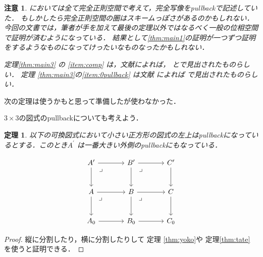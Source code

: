 \documentclass[leqno, a4paper, 12pt, dvipdfmx]{jsarticle}
\newtheorem{thm}{定理}
\newtheorem*{rmk}{注意}
\begin{document}
\begin{rmk}
\cite{com}においては全て完全正則空間で考えて，完全写像をpullbackで記述していた．
もしかしたら完全正則空間の圏はスキームっぽさがあるのかもしれない．今回の文書では，筆者が手を加えて最後の定理以外ではなるべく一般の位相空間で証明が済むようになっている．
結果として\ref{thm:main1}の証明が一つずつ証明をするようなものになってけったいなものなったかもしれない．

定理\ref{thm:main3}
の
\ref{item:comp}
は，文献\cite{mic}によれば，
\cite[Theorem 1]{nag}と\cite[Theorem, p.21]{van}で見出されたものらしい．
定理
\ref{thm:main3}の\ref{item:0pullback}
は文献\cite{the}
によれば
\cite[Lemma 1.5]{duk}
で見出されたものらしい．

\end{rmk}

次の定理は使うかもと思って準備したが使わなかった．

$3\times 3$の図式のpullbackについても考えよう．
\begin{thm}\label{thm:3by3}
以下の可換図式において小さい正方形の図式の左上はpullbackになっているとする．このとき$A^{\prime}$
は一番大きい外側のpullbackにもなっている．

\[
\begin{tikzcd}[row sep=large, column sep=large]
A' \arrow[r] \arrow[d] 
\arrow[dr, phantom, "\lrcorner", very near start]
& B' \arrow[r] \arrow[d] 
\arrow[dr, phantom, "\lrcorner", very near start]
& C' \arrow[d] \\
A \arrow[r] \arrow[d] 
\arrow[dr, phantom, "\lrcorner", very near start]
& B \arrow[r] \arrow[d] 
\arrow[dr, phantom, "\lrcorner", very near start]
& C \arrow[d] \\
A_0 \arrow[r] & B_0 \arrow[r] & C_0
\end{tikzcd}
\]
\end{thm}
\begin{proof}
縦に分割したり，横に分割したりして
定理
\ref{thm:yoko}や
定理\ref{thm:tate}
を使うと証明できる．
\end{proof}
\end{document}
